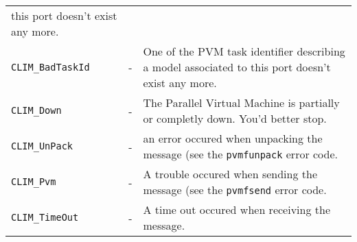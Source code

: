 \begin{description}
\begin{tabular}{l l p{10cm} }
this port doesn't exist any more. \\
      {\tt CLIM\_BadTaskId} & - & One of the PVM task identifier
describing a model associated to this port doesn't exist any more. \\
      {\tt CLIM\_Down} & - & The Parallel Virtual Machine is partially
or completly down. You'd better stop. \\
      {\tt CLIM\_UnPack} & - & an error occured when unpacking the message
(see the {\tt pvmfunpack} error code. \\
      {\tt CLIM\_Pvm} & - & A trouble occured when sending the message (see
the {\tt pvmfsend} error code. \\
      {\tt CLIM\_TimeOut} & - & A time out occured when receiving the
message. \\
    \end{tabular}
\end{description}
%
%
